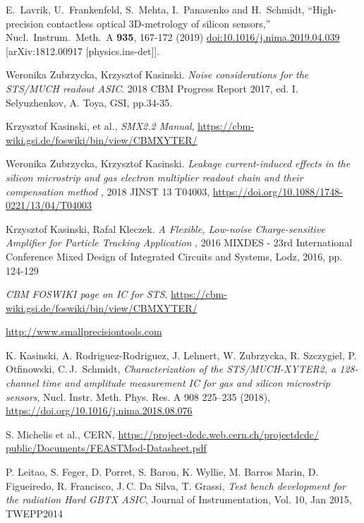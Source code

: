 \begin{thebibliography}{99}
	E.~Lavrik, U.~Frankenfeld, S.~Mehta, I.~Panasenko and H.~Schmidt,
	``High-precision contactless optical 3D-metrology of silicon sensors,''
	Nucl.\ Instrum.\ Meth.\ A \textbf{935}, 167-172 (2019)
	\url{doi:10.1016/j.nima.2019.04.039}
	[arXiv:1812.00917 [physics.ins-det]].

Weronika Zubrzycka, Krzysztof Kasinski. 
\textit{Noise considerations for the STS/MUCH readout ASIC}. 
2018 CBM Progress Report 2017, ed. I. Selyuzhenkov, A. Toya, GSI, pp.34-35.

Krzysztof Kasinski, et al., 
\textit{SMX2.2 Manual}, \url{https://cbm-wiki.gsi.de/foswiki/bin/view/CBMXYTER/}

Weronika Zubrzycka, Krzysztof Kasinski. 
\textit{Leakage current-induced effects in the silicon microstrip and gas electron multiplier readout chain and their compensation method }, 
2018 JINST 13 T04003, \url{https://doi.org/10.1088/1748-0221/13/04/T04003}

Krzysztof Kasinski, Rafal Kleczek. 
\textit{A Flexible, Low-noise Charge-sensitive Amplifier for Particle Tracking Application }, 2016 MIXDES - 23rd International Conference Mixed Design of Integrated Circuits and Systems, Lodz, 2016, pp. 124-129 

\textit{CBM FOSWIKI page on IC for STS}, \url{https://cbm-wiki.gsi.de/foswiki/bin/view/CBMXYTER/}

\url{http://www.smallprecisiontools.com}

 K. Kasinski, A. Rodriguez-Rodriguez, J. Lehnert, W. Zubrzycka, R. Szczygiel, P. Otfinowski, \mbox{C.\,J.~Schmidt}, {\em Characterization of the STS/MUCH-XYTER2, a 128-channel time and amplitude measurement IC for gas and silicon microstrip sensors}, Nucl. Instr. Meth. Phys. Res. A 908 225–235 (2018),  \url{https://doi.org/10.1016/j.nima.2018.08.076}

 S. Michelis et al., CERN, \url{https://project-dcdc.web.cern.ch/projectdcdc/
public/Documents/FEASTMod-Datasheet.pdf}

P. Leitao, S. Feger, D. Porret, S. Baron, K. Wyllie, M. Barros Marin, D. Figueiredo, R. Francisco, J.\,C. Da Silva, T. Grassi, {\em Test bench development for the radiation Hard GBTX ASIC}, Journal of Instrumentation, Vol. 10, Jan 2015, TWEPP2014


\end{thebibliography}
